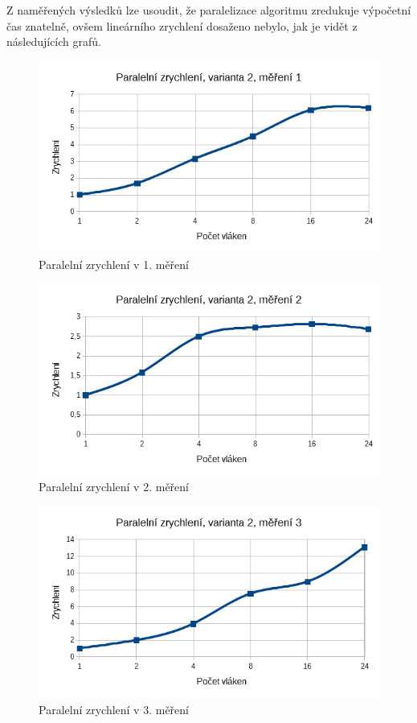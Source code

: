 \documentclass[12pt]{article}
\begin{document}
Z naměřených výsledků lze usoudit, že paralelizace algoritmu zredukuje výpočetní čas znatelně, ovšem lineárního zrychlení dosaženo nebylo, jak je vidět z následujících grafů.

\begin{figure}[H]
  \begin{center}
     \includegraphics[width=12cm]{images/sse1acc.png}
    \caption{Paralelní zrychlení v 1. měření} 
  \end{center}
\end{figure}

\begin{figure}
  \begin{center}
     \includegraphics[width=12cm]{images/sse2acc.png}
    \caption{Paralelní zrychlení v 2. měření} 
  \end{center}
\end{figure}

\begin{figure}[H]
  \begin{center}
     \includegraphics[width=12cm]{images/sse3acc.png}
    \caption{Paralelní zrychlení v 3. měření} 
  \end{center}
\end{figure}
\end{document}
